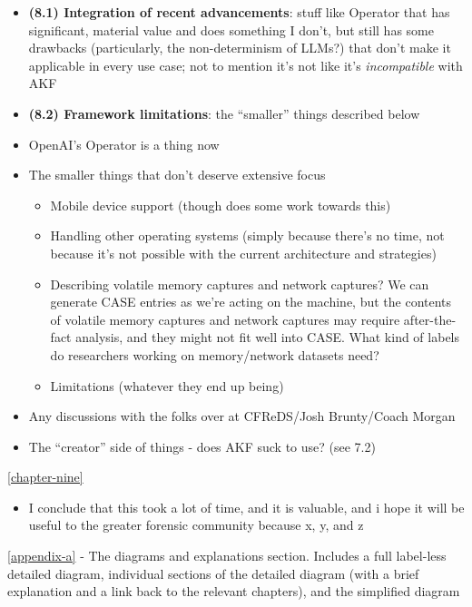 \begin{itemize}
\item
  \textbf{(8.1) Integration of recent advancements}: stuff like Operator
  that has significant, material value and does something I don't, but
  still has some drawbacks (particularly, the non-determinism of LLMs?)
  that don't make it applicable in every use case; not to mention it's
  not like it's \emph{incompatible} with AKF
\item
  \textbf{(8.2) Framework limitations}: the ``smaller'' things described
  below
\item
  OpenAI's Operator is a thing now
\item
  The smaller things that don't deserve extensive focus

  \begin{itemize}
  \tightlist
  \item
    Mobile device support (though
    \cite{demmelDataSynthesisGoing2024} does some work towards this)
  \item
    Handling other operating systems (simply because there's no time,
    not because it's not possible with the current architecture and
    strategies)
  \item
    Describing volatile memory captures and network captures? We can
    generate CASE entries as we're acting on the machine, but the
    contents of volatile memory captures and network captures may
    require after-the-fact analysis, and they might not fit well into
    CASE. What kind of labels do researchers working on memory/network
    datasets need?
  \item
    Limitations (whatever they end up being)
  \end{itemize}
\item
  Any discussions with the folks over at CFReDS/Josh Brunty/Coach Morgan
\item
  The ``creator'' side of things - does AKF suck to use? (see 7.2)
\end{itemize}

\autoref{chapter-nine}

\begin{itemize}
\tightlist
\item
  I conclude that this took a lot of time, and it is valuable, and i
  hope it will be useful to the greater forensic community because x, y,
  and z
\end{itemize}

\autoref{appendix-a} - The diagrams and explanations
section. Includes a full label-less detailed diagram, individual
sections of the detailed diagram (with a brief explanation and a link
back to the relevant chapters), and the simplified diagram
